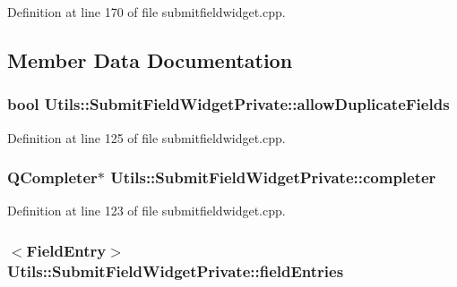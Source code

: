 Definition at line 170 of file submitfieldwidget.\-cpp.



\subsection{Member Data Documentation}
\hypertarget{struct_utils_1_1_submit_field_widget_private_a1ca5838c86c52dfc9b8870b8a6d294bb}{
\subsubsection[{allow\-Duplicate\-Fields}]{\setlength{\rightskip}{0pt plus 5cm}bool Utils\-::\-Submit\-Field\-Widget\-Private\-::allow\-Duplicate\-Fields}}\label{struct_utils_1_1_submit_field_widget_private_a1ca5838c86c52dfc9b8870b8a6d294bb}


Definition at line 125 of file submitfieldwidget.\-cpp.

\hypertarget{struct_utils_1_1_submit_field_widget_private_ac12876e8b7b00d8ad515b9d4511f9514}{
\subsubsection[{completer}]{\setlength{\rightskip}{0pt plus 5cm}Q\-Completer$\ast$ Utils\-::\-Submit\-Field\-Widget\-Private\-::completer}}\label{struct_utils_1_1_submit_field_widget_private_ac12876e8b7b00d8ad515b9d4511f9514}


Definition at line 123 of file submitfieldwidget.\-cpp.

\hypertarget{struct_utils_1_1_submit_field_widget_private_a7f0075b86997f84922636913eb8ed081}{
\subsubsection[{field\-Entries}]{$<${\bf Field\-Entry}$>$ Utils\-::\-Submit\-Field\-Widget\-Private\-::field\-Entries}}\label{struct_utils_1_1_submit_field_widget_private_a7f0075b86997f84922636913eb8ed081}


